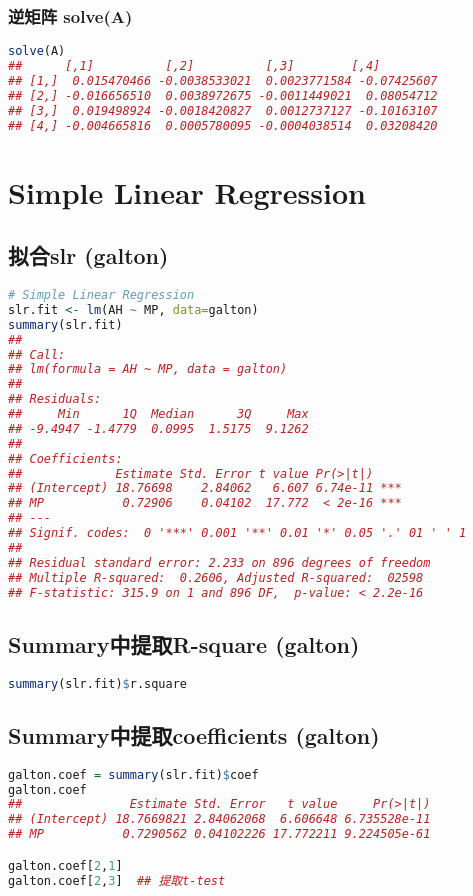 \documentclass[11pt,a4paper]{article}
\begin{document}
\subsubsection{逆矩阵 solve(A)}
\begin{lstlisting}[language=R]
solve(A)
##      [,1]          [,2]          [,3]        [,4]
## [1,]  0.015470466 -0.0038533021  0.0023771584 -0.07425607
## [2,] -0.016656510  0.0038972675 -0.0011449021  0.08054712
## [3,]  0.019498924 -0.0018420827  0.0012737127 -0.10163107
## [4,] -0.004665816  0.0005780095 -0.0004038514  0.03208420
\end{lstlisting}




\section{Simple Linear Regression}
\subsection{拟合slr (galton)}
\begin{lstlisting}[language=R]
# Simple Linear Regression
slr.fit <- lm(AH ~ MP, data=galton)
summary(slr.fit)
## 
## Call:
## lm(formula = AH ~ MP, data = galton)
## 
## Residuals:
##     Min      1Q  Median      3Q     Max 
## -9.4947 -1.4779  0.0995  1.5175  9.1262 
## 
## Coefficients:
##             Estimate Std. Error t value Pr(>|t|)    
## (Intercept) 18.76698    2.84062   6.607 6.74e-11 ***
## MP           0.72906    0.04102  17.772  < 2e-16 ***
## ---
## Signif. codes:  0 '***' 0.001 '**' 0.01 '*' 0.05 '.' 01 ' ' 1
## 
## Residual standard error: 2.233 on 896 degrees of freedom
## Multiple R-squared:  0.2606, Adjusted R-squared:  02598 
## F-statistic: 315.9 on 1 and 896 DF,  p-value: < 2.2e-16
\end{lstlisting}

\subsection{Summary中提取R-square (galton)}
\begin{lstlisting}[language=R]
summary(slr.fit)$r.square
\end{lstlisting}
\subsection{Summary中提取coefficients (galton)}
\begin{lstlisting}[language=R]
galton.coef = summary(slr.fit)$coef
galton.coef
##               Estimate Std. Error   t value     Pr(>|t|)
## (Intercept) 18.7669821 2.84062068  6.606648 6.735528e-11
## MP           0.7290562 0.04102226 17.772211 9.224505e-61

galton.coef[2,1]
galton.coef[2,3]  ## 提取t-test
\end{lstlisting}
\end{document}
